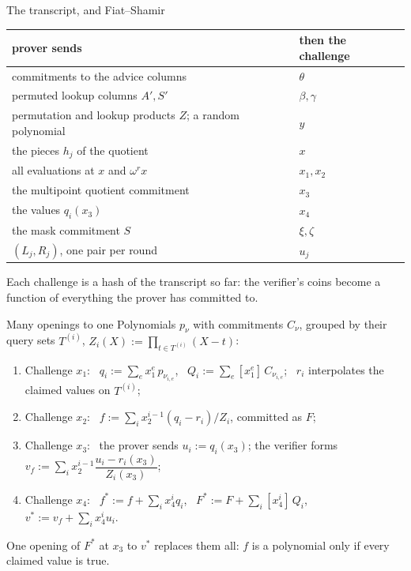 \documentclass[aspectratio=169,11pt]{beamer}
\begin{document}
\begin{frame}{The transcript, and Fiat--Shamir}
\begin{center}\small
\begin{tabular}{@{}ll@{}}
\toprule
prover sends & then the challenge \\
\midrule
commitments to the advice columns & $\theta$ \\
permuted lookup columns $A', S'$ & $\beta, \gamma$ \\
permutation and lookup products $Z$; a random polynomial & $y$ \\
the pieces $h_j$ of the quotient & $x$ \\
all evaluations at $x$ and $\omega^r x$ & $x_1, x_2$ \\
the multipoint quotient commitment & $x_3$ \\
the values $q_i(x_3)$ & $x_4$ \\
the mask commitment $S$ & $\xi, \zeta$ \\
$(L_j, R_j)$, one pair per round & $u_j$ \\
\bottomrule
\end{tabular}
\end{center}
\vfill
Each challenge is a hash of the transcript so far: the verifier's coins
become a function of everything the prover has committed to.
\end{frame}

\begin{frame}{Many openings to one}
\small
Polynomials $p_\nu$ with commitments $C_\nu$, grouped by their query sets
$T^{(i)}$, $Z_i(X) := \prod_{t \in T^{(i)}} (X - t)$:
\begin{enumerate}\itemsep3pt
\item Challenge $x_1$: \ $q_i := \sum_e x_1^e\, p_{\nu_{i,e}}$, \ $Q_i := \sum_e [x_1^e]\,C_{\nu_{i,e}}$; \ $r_i$ interpolates the claimed values on $T^{(i)}$;
\item Challenge $x_2$: \ $f := \sum_i x_2^{i-1} (q_i - r_i)/Z_i$, committed as $F$;
\item Challenge $x_3$: \ the prover sends $u_i := q_i(x_3)$; the verifier forms
  $v_f := \sum_i x_2^{i-1} \dfrac{u_i - r_i(x_3)}{Z_i(x_3)}$;
\item Challenge $x_4$: \ $f^{*} := f + \sum_i x_4^i q_i$, \ $F^{*} := F + \sum_i [x_4^i]\,Q_i$,
  \ $v^{*} := v_f + \sum_i x_4^i u_i$.
\end{enumerate}
\vfill
One opening of $F^{*}$ at $x_3$ to $v^{*}$ replaces them all: $f$ is a
polynomial only if every claimed value is true.
\end{frame}
\end{document}

